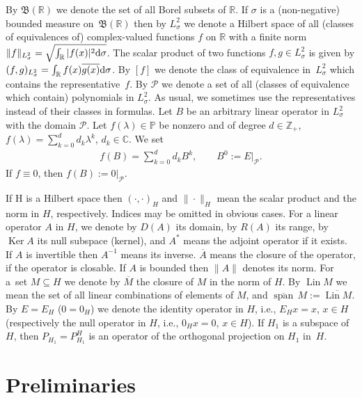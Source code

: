 \documentclass[11pt]{article}
\numberwithin{equation}{section}
\begin{document}
By $\mathfrak{B}(\mathbb{R})$ we denote the set of all Borel subsets of $\mathbb{R}$. If $\sigma$ is a (non-negative) bounded measure on~$\mathfrak{B}(\mathbb{R})$ then by $L^2_\sigma$ we denote a Hilbert space of all (classes of equivalences of) complex-valued functions $f$ on $\mathbb{R}$ with a f\/inite norm $\| f \|_{L^2_\sigma} = \sqrt{ \int_\mathbb{R} |f(x)|^2 {\rm d}\sigma }$. The scalar product of two functions $f,g\in L^2_\sigma$ is given by $(f,g)_{L^2_\sigma} = \int_{\mathbb{R}} f(x) \overline{g(x)} {\rm d}\sigma$. By $[ f ]$ we denote the class of equivalence in~$L^2_\sigma$ which contains the representative~$f$. By $\mathcal{P}$ we denote a set of all (classes of equivalence which contain) polynomials in $L^2_\sigma$. As usual, we sometimes use the representatives instead of their classes in formulas. Let $B$ be an arbitrary linear operator in $L^2_\sigma$ with the domain $\mathcal{P}$. Let $f(\lambda)\in\mathbb{P}$ be nonzero and of degree $d\in\mathbb{Z}_+$, $f(\lambda) = \sum\limits_{k=0}^d d_k \lambda^k$, $d_k\in\mathbb{C}$. We set
\begin{gather*} f(B) = \sum_{k=0}^d d_k B^k,\qquad B^0 := E|_{\mathcal{P}}. \end{gather*}
If $f\equiv 0$, then $f(B):= 0|_{\mathcal{P}}$.

If H is a Hilbert space then $(\cdot,\cdot)_H$ and $\| \cdot \|_H$ mean the scalar product and the norm in $H$, respectively. Indices may be omitted in obvious cases. For a linear operator $A$ in $H$, we denote by $D(A)$ its domain, by $R(A)$ its range, by $\operatorname{Ker} A$ its null subspace (kernel), and $A^*$ means the adjoint operator if it exists. If $A$ is invertible then $A^{-1}$ means its inverse. $\overline{A}$ means the closure of the operator, if the operator is closable. If $A$ is bounded then $\| A \|$ denotes its norm. For a~set $M\subseteq H$ we denote by $\overline{M}$ the closure of $M$ in the norm of $H$. By $\operatorname{Lin} M$ we mean the set of all linear combinations of elements of $M$, and $\overline{\operatorname{span}}\, M := \overline{\operatorname{Lin} M}$. By $E=E_H$ ($0=0_H$) we denote the identity operator in $H$, i.e., $E_H x = x$, $x\in H$ (respectively the null operator in $H$, i.e., $0_H x = 0$, $x\in H$). If $H_1$ is a subspace of $H$, then $P_{H_1} = P_{H_1}^{H}$ is an operator of the orthogonal projection on $H_1$ in~$H$.

\section{Preliminaries}
\end{document}
